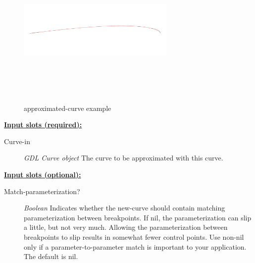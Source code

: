 \documentclass [11pt]{book}
\begin{document}
\begin{itemize}
\begin{figure}
\begin{center}
\includegraphics[width=3in,height=3in]{../images/example-approximated-curve.pdf}
\end{center}

\caption{approximated-curve example}

\label{fig:approximated-curve}

\end{figure}





\textbf{
\underline{Input slots (required):}}

\begin{description}

\item [Curve-in]
\emph{GDL Curve object} The curve to be approximated with this curve.


\end{description}






\textbf{
\underline{Input slots (optional):}}

\begin{description}

\item [Match-parameterization?]
\emph{Boolean} Indicates whether the new-curve should contain matching parameterization between breakpoints. If nil, the
parameterization can slip a little, but not very much. Allowing the parameterization between breakpoints to slip
results in somewhat fewer control points. Use non-nil only if a parameter-to-parameter match is important to your application.
The default is nil.



\end{description}
\end{itemize}
\end{document}
